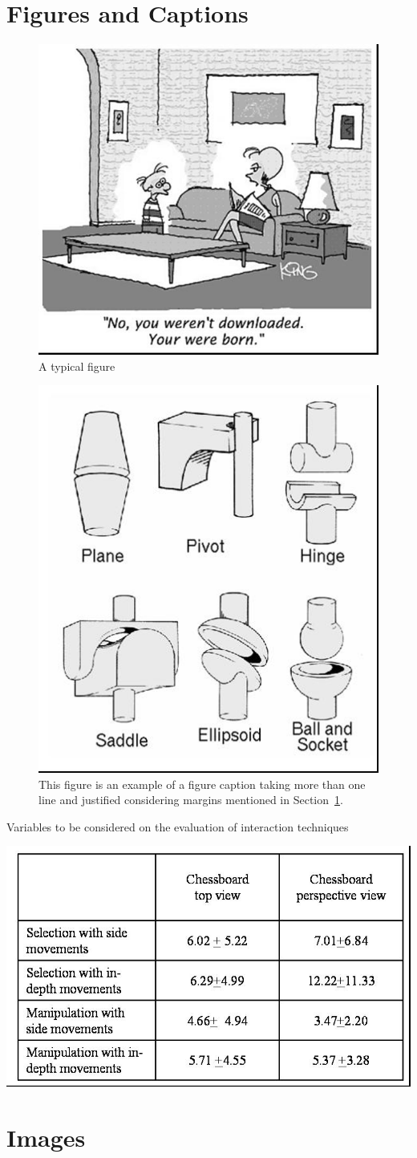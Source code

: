 \documentclass[12pt]{article}
\begin{document}
\section{Figures and Captions}\label{sec:figs}
\begin{figure}[ht]
\centering
\includegraphics[width=.5\textwidth]{assets/img/fig1.jpg}
\caption{A typical figure}
\label{fig:exampleFig1}
\end{figure}

\begin{figure}[ht]
\centering
\includegraphics[width=.3\textwidth]{assets/img/fig2.jpg}
\caption{This figure is an example of a figure caption taking more than one
  line and justified considering margins mentioned in Section~\ref{sec:figs}.}
\label{fig:exampleFig2}
\end{figure}
\begin{table}[ht]
\centering
\caption{Variables to be considered on the evaluation of interaction
  techniques}
\label{tab:exTable1}
\includegraphics[width=.7\textwidth]{assets/img/table.jpg}
\end{table}
\section{Images}



\end{document}
